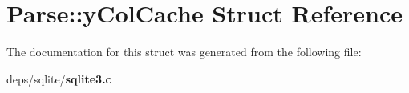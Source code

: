 \section{Parse::y\-Col\-Cache Struct Reference}
\label{structParse_1_1yColCache}


The documentation for this struct was generated from the following file:\begin{CompactItemize}
\item 
deps/sqlite/\bf{sqlite3.c}\end{CompactItemize}
